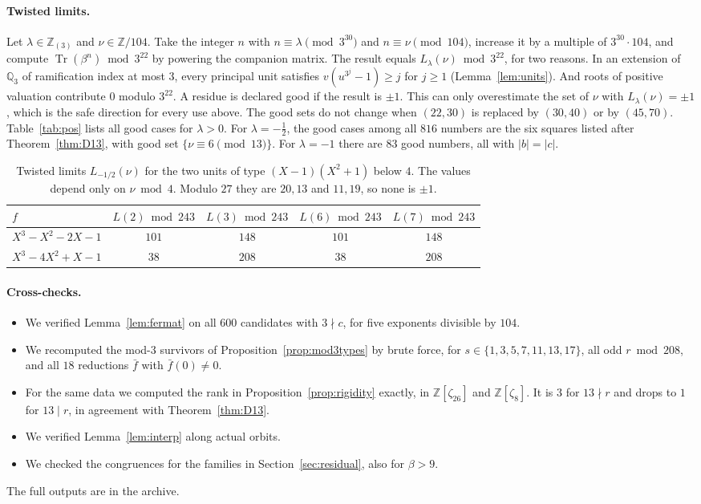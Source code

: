 \documentclass[11pt,a4paper]{article}
\theoremstyle{definition}
\theoremstyle{remark}
\newcommand{\Z}{\mathbb{Z}}
\newcommand{\Qt}{\mathbb{Q}_3}
\DeclareMathOperator{\Tr}{Tr}
\begin{document}
\paragraph{Twisted limits.}
Let $\lambda\in\Z_{(3)}$ and $\nu\in\Z/104$.
Take the integer $n$ with $n\equiv\lambda\pmod{3^{30}}$ and $n\equiv\nu\pmod{104}$, increase it by a multiple of $3^{30}\cdot104$, and compute $\Tr(\beta^n)\bmod3^{22}$ by powering the companion matrix.
The result equals $L_\lambda(\nu)\bmod3^{22}$, for two reasons. In an extension of $\Qt$ of ramification index at most $3$, every principal unit satisfies $v(u^{3^j}-1)\ge j$ for $j\ge1$ (Lemma~\ref{lem:units}). And roots of positive valuation contribute $0$ modulo $3^{22}$.
A residue is declared good if the result is $\pm1$.
This can only overestimate the set of $\nu$ with $L_\lambda(\nu)=\pm1$, which is the safe direction for every use above.
The good sets do not change when $(22,30)$ is replaced by $(30,40)$ or by $(45,70)$.
Table~\ref{tab:pos} lists all good cases for $\lambda>0$.
For $\lambda=-\frac12$, the good cases among all $816$ numbers are the six squares listed after Theorem~\ref{thm:D13}, with good set $\{\nu\equiv6\pmod{13}\}$.
For $\lambda=-1$ there are $83$ good numbers, all with $|b|=|c|$.

\begin{table}[ht]
\centering
\begin{tabular}{lcccc}
\toprule
$f$ & $L(2)\bmod243$ & $L(3)\bmod243$ & $L(6)\bmod243$ & $L(7)\bmod243$\\
\midrule
$X^3-X^2-2X-1$ & $101$ & $148$ & $101$ & $148$\\
$X^3-4X^2+X-1$ & $38$ & $208$ & $38$ & $208$\\
\bottomrule
\end{tabular}
\caption{Twisted limits $L_{-1/2}(\nu)$ for the two units of type $(X-1)(X^2+1)$ below $4$. The values depend only on $\nu\bmod 4$. Modulo $27$ they are $20,13$ and $11,19$, so none is $\pm1$.}\label{tab:b0}
\end{table}

\paragraph{Cross-checks.}
\begin{itemize}
\item We verified Lemma~\ref{lem:fermat} on all $600$ candidates with $3\nmid c$, for five exponents divisible by $104$.
\item We recomputed the mod-$3$ survivors of Proposition~\ref{prop:mod3types} by brute force, for $s\in\{1,3,5,7,11,13,17\}$, all odd $r\bmod208$, and all $18$ reductions $\bar f$ with $\bar f(0)\ne0$.
\item For the same data we computed the rank in Proposition~\ref{prop:rigidity} exactly, in $\Z[\zeta_{26}]$ and $\Z[\zeta_8]$. It is $3$ for $13\nmid r$ and drops to $1$ for $13\mid r$, in agreement with Theorem~\ref{thm:D13}.
\item We verified Lemma~\ref{lem:interp} along actual orbits.
\item We checked the congruences for the families in Section~\ref{sec:residual}, also for $\beta>9$.
\end{itemize}
The full outputs are in the archive.
\end{document}

